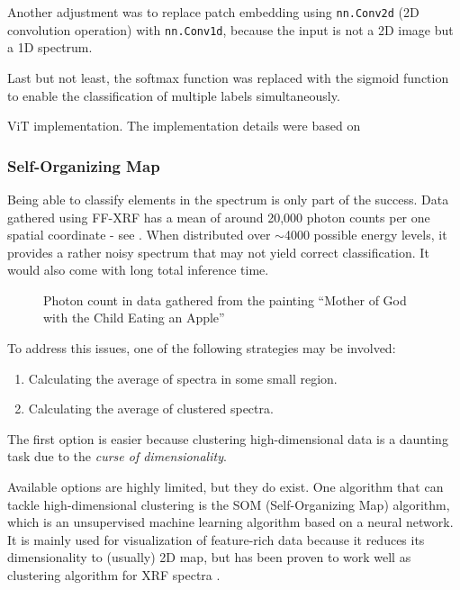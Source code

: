 Another adjustment was to replace patch embedding using \texttt{nn.Conv2d} (2D convolution operation) with \texttt{nn.Conv1d}, because the input is not a 2D image but a 1D spectrum. 

Last but not least, the softmax function was replaced with the sigmoid function to enable the classification of multiple labels simultaneously.

\newenvironment{longlistingC}{\captionsetup{type=listing, width=0.8\textwidth}}{}
\begin{longlistingC}
    \caption{ViT implementation. The implementation details were based on \cite{d2lViT}}
    \label{lst:vit}
\end{longlistingC}
\vspace{12pt}

\subsubsection{Self-Organizing Map}
Being able to classify elements in the spectrum is only part of the success. 
Data gathered using FF-XRF has a mean of around 20,000 photon counts per one spatial coordinate - see . 
When distributed over $\sim$4000 possible energy levels, it provides a rather noisy spectrum that may not yield correct classification. 
It would also come with long total inference time. 

\begin{figure}[H] 
  \centering     
   
  \caption{Photon count in data gathered from the painting ``Mother of God with the Child Eating an Apple''}
  \label{fig:matka-boska-photon-count}
\end{figure}

To address this issues, one of the following strategies may be involved:
\begin{enumerate}
  \item Calculating the average of spectra in some small region.
  \item Calculating the average of clustered spectra.
\end{enumerate}

The first option is easier because clustering high-dimensional data is a daunting task due to the \emph{curse of dimensionality}.

Available options are highly limited, but they do exist. 
One algorithm that can tackle high-dimensional clustering is the SOM (Self-Organizing Map) algorithm, which is an unsupervised machine learning algorithm based on a neural network. 
It is mainly used for visualization of feature-rich data because it reduces its dimensionality to (usually) 2D map, but has been proven to work well as clustering algorithm for XRF spectra \cite{Kogou2020}.

